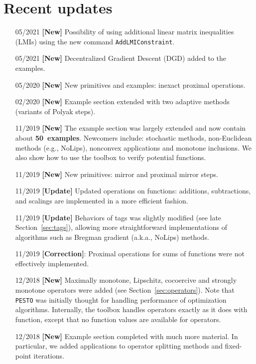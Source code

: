 \documentclass[11pt,a4paper]{article}
\begin{document}
	\section*{Recent updates}
	\begin{itemize}
		\item[05/2021] {\bf{}[New]} Possibility of using additional linear matrix inequalities (LMIs) using the new command \verb?AddLMIConstraint?.
		\item[05/2021] {\bf{}[New]} Decentralized Gradient Descent (DGD) added to the examples.
		\item[05/2020] {\bf{}[New]} New primitives and examples: inexact proximal operations.
		\item[02/2020] {\bf{}[New]} Example section extended with two adaptive methods (variants of Polyak steps).
		\item[11/2019] {\bf{}[New]} The example section was largely extended and now contain about {\bf 50~examples}. Newcomers include:  stochastic methods, non-Euclidean methods (e.g., NoLips), nonconvex applications and monotone inclusions. We also show how to use the toolbox to verify potential functions.
		\item[11/2019] {\bf{}[New]} New primitives: mirror and proximal mirror steps.
		\item[11/2019] {\bf{}[Update]} Updated operations on functions: additions, subtractions, and scalings are implemented in a more efficient fashion.
		\item[11/2019] {\bf{}[Update]} Behaviors of tags was slightly modified (see late Section~\ref{sec:tags}), allowing more straightforward implementations of algorithms such as Bregman gradient (a.k.a., NoLips) methods.
		\item[11/2019] {\bf{}[Correction]}: Proximal operations for sums of functions were not effectively implemented.
		\item[12/2018] {\bf{}[New]} Maximally monotone, Lipschitz, cocoercive and strongly monotone operators were added (see Section~\ref{sec:operators}). Note that \verb|PESTO| was initially thought for handling performance of optimization algorithms. Internally, the toolbox handles operators exactly as it does with function, except that no function values are available for operators.
		\item[12/2018] {\bf{}[New]} Example section completed with much more material. In particular, we added applications to operator splitting methods and fixed-point iterations.
	\end{itemize}
	
\end{document}
